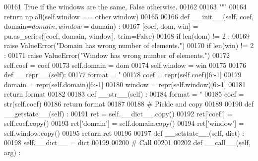 \begin{DoxyCode}
{00161 \textcolor{stringliteral}{            True if the windows are the same, False otherwise.}
00162 \textcolor{stringliteral}{}
00163 \textcolor{stringliteral}{        """}
00164 \textcolor{stringliteral}{        return np.all(self.window == other.window)}
00165 \textcolor{stringliteral}{}
00166 \textcolor{stringliteral}{    def \_\_init\_\_(self, coef, domain=$domain, window=$domain) :}
00167 \textcolor{stringliteral}{        [coef, dom, win] = pu.as\_series([coef, domain, window], trim=False)}
00168 \textcolor{stringliteral}{        if len(dom) != 2 :}
00169 \textcolor{stringliteral}{            raise ValueError("Domain has wrong number of elements.")}
00170 \textcolor{stringliteral}{        if len(win) != 2 :}
00171 \textcolor{stringliteral}{            raise ValueError("Window has wrong number of elements.")}
00172 \textcolor{stringliteral}{        self.coef = coef}
00173 \textcolor{stringliteral}{        self.domain = dom}
00174 \textcolor{stringliteral}{        self.window = win}
00175 \textcolor{stringliteral}{}
00176 \textcolor{stringliteral}{    def \_\_repr\_\_(self):}
00177 \textcolor{stringliteral}{        format = "%
00178 \textcolor{stringliteral}{        coef = repr(self.coef)[6:-1]}
00179 \textcolor{stringliteral}{        domain = repr(self.domain)[6:-1]}
00180 \textcolor{stringliteral}{        window = repr(self.window)[6:-1]}
00181 \textcolor{stringliteral}{        return format %
00182 \textcolor{stringliteral}{}
00183 \textcolor{stringliteral}{    def \_\_str\_\_(self) :}
00184 \textcolor{stringliteral}{        format = "%
00185 \textcolor{stringliteral}{        coef = str(self.coef)}
00186 \textcolor{stringliteral}{        return format %
00187 \textcolor{stringliteral}{}
00188 \textcolor{stringliteral}{    # Pickle and copy}
00189 \textcolor{stringliteral}{}
00190 \textcolor{stringliteral}{    def \_\_getstate\_\_(self) :}
00191 \textcolor{stringliteral}{        ret = self.\_\_dict\_\_.copy()}
00192 \textcolor{stringliteral}{        ret['coef'] = self.coef.copy()}
00193 \textcolor{stringliteral}{        ret['domain'] = self.domain.copy()}
00194 \textcolor{stringliteral}{        ret['window'] = self.window.copy()}
00195 \textcolor{stringliteral}{        return ret}
00196 \textcolor{stringliteral}{}
00197 \textcolor{stringliteral}{    def \_\_setstate\_\_(self, dict) :}
00198 \textcolor{stringliteral}{        self.\_\_dict\_\_ = dict}
00199 \textcolor{stringliteral}{}
00200 \textcolor{stringliteral}{    # Call}
00201 \textcolor{stringliteral}{}
00202 \textcolor{stringliteral}{    def \_\_call\_\_(self, arg) :}
}}}}}
\end{DoxyCode}
